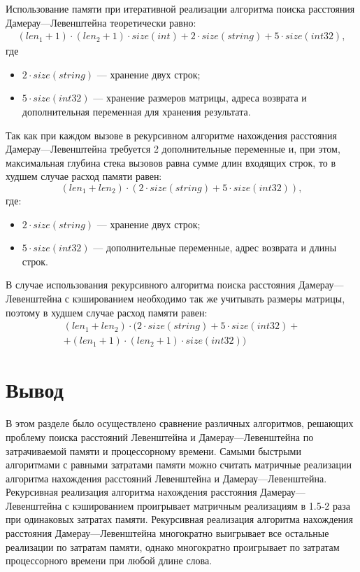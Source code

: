 Использование памяти при итеративной реализации алгоритма поиска расстояния Дамерау---Левенштейна теоретически равно:
\begin{equation}
	\begin{aligned}
		(len_{1} + 1) \cdot (len_{2} + 1) \cdot size(int) + 2 \cdot size(string) + 5 \cdot size(int32),
	\end{aligned}
\end{equation}
где 
\begin{itemize}
	\item $2 \cdot size(string)$ --- хранение двух строк;
	\item $5 \cdot size(int32)$ --- хранение размеров матрицы, адреса возврата и дополнительная переменная для хранения результата.
\end{itemize}

Так как при каждом вызове в рекурсивном алгоритме нахождения расстояния Дамерау---Левенштейна требуется 2 дополнительные переменные и, при этом, максимальная глубина стека вызовов равна сумме длин входящих строк, то в худшем случае расход памяти равен:
\begin{equation}
	(len_{1} + len_{2}) \cdot (2 \cdot size(string) + 5 \cdot size(int32)),
\end{equation}
где:
\begin{itemize}
	\item $2 \cdot size(string)$ --- хранение двух строк;
	\item $5 \cdot size(int32)$ --- дополнительные переменные, адрес возврата и длины строк.
\end{itemize}

В случае использования рекурсивного алгоритма поиска расстояния Дамерау---Левенштейна с кэшированием необходимо так же учитывать размеры матрицы, поэтому в худшем случае расход памяти равен:
\begin{equation}
	\begin{aligned}
		(len_{1} + len_{2}) \cdot (2 \cdot size(string) + 5 \cdot size(int32) + \\ + (len_{1} + 1) \cdot (len_{2} + 1) \cdot size(int32))
	\end{aligned}
\end{equation}

\section*{Вывод}

В этом разделе было осуществлено сравнение различных алгоритмов, решающих проблему поиска расстояний Левенштейна и Дамерау---Левенштейна по затрачиваемой памяти и процессорному времени. 
Самыми быстрыми алгоритмами с равными затратами памяти можно считать матричные реализации алгоритма нахождения расстояний Левенштейна и Дамерау---Левенштейна.
Рекурсивная реализация алгоритма нахождения расстояния Дамерау---Левенштейна с кэшированием проигрывает матричным реализациям в 1.5-2 раза при одинаковых затратах памяти. 
Рекурсивная реализация алгоритма нахождения расстояния Дамерау---Левенштейна многократно выигрывает все остальные реализации по затратам памяти, однако многократно проигрывает по затратам процессорного времени при любой длине слова.